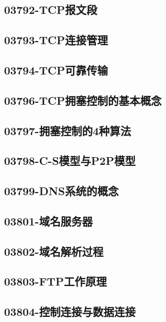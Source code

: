\subsection{03792-TCP报文段}

\subsection{03793-TCP连接管理}

\subsection{03794-TCP可靠传输}

\subsection{03796-TCP拥塞控制的基本概念}

\subsection{03797-拥塞控制的4种算法}

\subsection{03798-C-S模型与P2P模型}

\subsection{03799-DNS系统的概念}

\subsection{03801-域名服务器}

\subsection{03802-域名解析过程}

\subsection{03803-FTP工作原理}

\subsection{03804-控制连接与数据连接}

